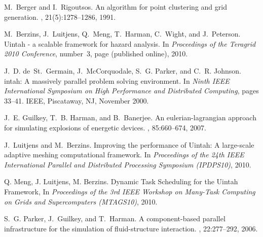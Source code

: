
\begin{thebibliography}{10}

M.~Berger and I.~Rigoutsos.
\newblock An algorithm for point clustering and grid generation.
, 21(5):1278--1286, 1991.

M.~Berzins, J.~Luitjens, Q.~Meng, T.~Harman, C.~Wight, and J.~Peterson.
\newblock Uintah - a scalable framework for hazard analysis.
\newblock In {\em Proceedings of the Teragrid 2010 Conference}, number~3, page (published online), 2010.

J.~D. de~St.~Germain, J.~McCorquodale, S.~G. Parker, and C.~R. Johnson.
intah: {A} massively parallel problem solving environment.
\newblock In {\em Ninth {IEEE} International Symposium on High Performance and Distributed Computing}, pages 33--41. {IEEE}, Piscataway, NJ, November 2000.

J.~E. Guilkey, T.~B. Harman, and B.~Banerjee.
\newblock An eulerian-lagrangian approach for simulating explosions of energetic devices.
, 85:660--674, 2007.
 
J.~Luitjens and M.~Berzins.
\newblock Improving the performance of {U}intah: {A} large-scale adaptive meshing computational framework.
\newblock In {\em Proceedings of the 24th IEEE International Parallel and Distributed Processing Symposium (IPDPS10)}, 2010. 

Q. Meng, J. Luitjens, M. Berzins. 
\newblock Dynamic Task Scheduling for the Uintah Framework, 
\newblock In {\em Proceedings of the 3rd IEEE Workshop on Many-Task Computing on Grids and Supercomputers (MTAGS10)}, 2010.

S.~G. Parker, J.~Guilkey, and T.~Harman.
\newblock A component-based parallel infrastructure for the simulation of fluid-structure interaction.
, 22:277--292, 2006.

\end{thebibliography}